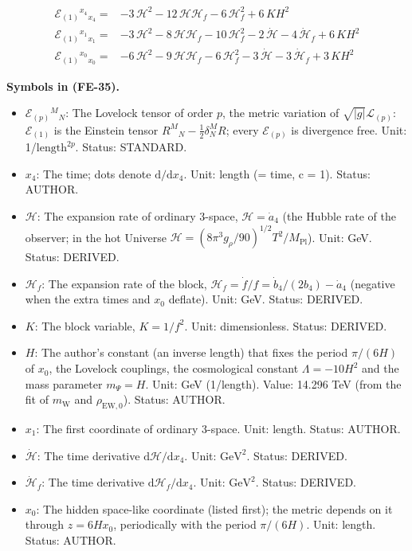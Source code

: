 \documentclass[
  10pt,
]{article}
\providecommand{\tightlist}{%
  \setlength{\itemsep}{0pt}\setlength{\parskip}{0pt}}
\begin{document}
\[
\begin{aligned}
\mathcal{E}_{(1)}{}^{x_4}{}_{x_4} ={}& -3\,\mathcal{H}^{2} - 12\,\mathcal{H}\mathcal{H}_f -
 6\,\mathcal{H}_f^{2} + 6\,KH^{2} \\
\mathcal{E}_{(1)}{}^{x_1}{}_{x_1} ={}& -3\,\mathcal{H}^{2} - 8\,\mathcal{H}\mathcal{H}_f -
 10\,\mathcal{H}_f^{2} - 2\,\dot{\mathcal{H}} - 4\,\dot{\mathcal{H}}_f + 6\,KH^{2} \\
\mathcal{E}_{(1)}{}^{x_0}{}_{x_0} ={}& -6\,\mathcal{H}^{2} - 9\,\mathcal{H}\mathcal{H}_f -
 6\,\mathcal{H}_f^{2} - 3\,\dot{\mathcal{H}} - 3\,\dot{\mathcal{H}}_f + 3\,KH^{2}
\end{aligned} \tag{FE-35}
\]

\textbf{Symbols in (FE-35).}

\begin{itemize}
\tightlist
\item
  \(\mathcal{E}_{(p)}{}^M{}_N\): The Lovelock tensor of order \(p\), the
  metric variation of \(\sqrt{\lvert g\rvert}\mathcal{L}_{(p)}\):
  \(\mathcal{E}_{(1)}\) is the Einstein tensor
  \(R^M{}_N - \frac12\delta^M_NR\); every \(\mathcal{E}_{(p)}\) is
  divergence free. Unit: 1/\(\mathrm{length}^{2p}\). Status: STANDARD.
\item
  \(x_4\): The time; dots denote \(\mathrm{d}/\mathrm{d}x_4\). Unit:
  length (= time, c = 1). Status: AUTHOR.
\item
  \(\mathcal{H}\): The expansion rate of ordinary 3-space,
  \(\mathcal{H} = \dot a_4\) (the Hubble rate of the observer; in the
  hot Universe
  \(\mathcal{H} = (8\pi^3g_\rho/90)^{1/2}T^2/M_{\mathrm{Pl}}\)). Unit:
  GeV. Status: DERIVED.
\item
  \(\mathcal{H}_f\): The expansion rate of the block,
  \(\mathcal{H}_f = \dot f/f = \dot b_4/(2b_4) - \dot a_4\) (negative
  when the extra times and \(x_0\) deflate). Unit: GeV. Status: DERIVED.
\item
  \(K\): The block variable, \(K = 1/f^2\). Unit: dimensionless. Status:
  DERIVED.
\item
  \(H\): The author's constant (an inverse length) that fixes the period
  \(\pi/(6H)\) of \(x_0\), the Lovelock couplings, the cosmological
  constant \(\Lambda = -10H^2\) and the mass parameter \(m_\Psi = H\).
  Unit: GeV (1/length). Value: 14.296 TeV (from the fit of
  \(m_{\mathrm{W}}\) and \(\rho_{\mathrm{EW},0}\)). Status: AUTHOR.
\item
  \(x_1\): The first coordinate of ordinary 3-space. Unit: length.
  Status: AUTHOR.
\item
  \(\dot{\mathcal{H}}\): The time derivative
  \(\mathrm{d}\mathcal{H}/\mathrm{d}x_4\). Unit: \(\mathrm{GeV}^{2}\).
  Status: DERIVED.
\item
  \(\dot{\mathcal{H}}_f\): The time derivative
  \(\mathrm{d}\mathcal{H}_f/\mathrm{d}x_4\). Unit: \(\mathrm{GeV}^{2}\).
  Status: DERIVED.
\item
  \(x_0\): The hidden space-like coordinate (listed first); the metric
  depends on it through \(z = 6Hx_0\), periodically with the period
  \(\pi/(6H)\). Unit: length. Status: AUTHOR.
\end{itemize}
\end{document}
